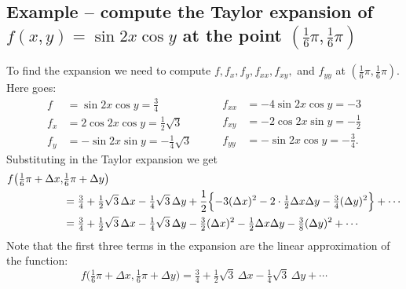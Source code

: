 \subsection{Example -- compute the Taylor expansion of $f(x, y) = \sin2x\cos y$
  at the point $(\frac16\pi, \frac16\pi)$}
To find the expansion we need to compute $f, f_x, f_y, f_{xx},
f_{xy},$ and $f_{yy}$ at $(\frac16\pi, \frac16\pi)$.  Here goes:
\[
\begin{aligned}
  f&= \sin 2x \cos y = \tfrac 34 \\
  f_x&=2\cos 2x\cos y = \tfrac12\sqrt{3}\\
  f_y&=-\sin2x \sin y = -\tfrac 14\sqrt3 
\end{aligned}
\qquad
\begin{aligned}
  f_{xx}&=-4\sin2x\cos y = -3 \\
  f_{xy}&=-2\cos 2x\sin y = -\tfrac12 \\
  f_{yy}&=-\sin 2x\cos y = -\tfrac 34.
\end{aligned}
\]
Substituting in the Taylor expansion we get
\begin{align*}
  f\bigl( \tfrac16\pi+\Delta x, &\tfrac16\pi+\Delta y\bigr)\\
  &=
  \tfrac 34 +\tfrac12\sqrt3 \,\Delta x -\tfrac14\sqrt3\,\Delta y
  +\frac12\Bigl\{
  -3(\Delta x)^2 -2\cdot\tfrac12 \Delta x \Delta y - \tfrac34 (\Delta
  y)^2
  \Bigr\} + \cdots\\
  &=\tfrac 34 +\tfrac12\sqrt3 \,\Delta x -\tfrac14\sqrt3\,\Delta y
  -\tfrac32(\Delta x)^2 -\tfrac12 \Delta x \Delta y -\tfrac38(\Delta y)^2
  +\cdots
\end{align*}
Note that the first three terms in the expansion are the linear
approximation of the function:
\[
f\bigl( \tfrac16\pi+\Delta x, \tfrac16\pi+\Delta y\bigr)
= \tfrac 34 +\tfrac12\sqrt3 \, \Delta x -\tfrac14\sqrt3\, \Delta y +\cdots
\]

